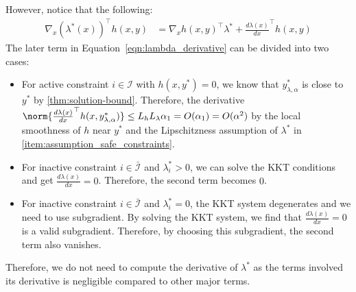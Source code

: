However, notice that the following:
\begin{align}\label{eqn:lambda_derivative}
    \nabla_x (\lambda^*(x))^\top h(x,y) & = \nabla_x h(x,y)^\top \lambda^* + \frac{d \lambda(x)}{dx}^\top h(x,y)
\end{align}
The later term in Equation~\cref{eqn:lambda_derivative} can be divided into two cases:
\begin{itemize}
    \item For active constraint $i \in \mathcal{I}$ with $h(x,y^*) = 0$, we know that $y^*_{\lambda,\alpha}$ is close to $y^*$ by \cref{thm:solution-bound}. Therefore, the derivative $\norm{\frac{d \lambda(x)}{dx}^\top h(x,y^*_{\lambda,\alpha})} \leq L_h L_\lambda \alpha_1 = O(\alpha_1) = O(\alpha^2)$ by the local smoothness of $h$ near $y^*$ and the Lipschitzness assumption of $\lambda^*$ in \cref{item:assumption_safe_constraints}.
    \item For inactive constraint $i \in \bar{\mathcal{I}}$ and $\lambda^*_i > 0$, we can solve the KKT conditions and get $\frac{d \lambda(x)}{dx} = 0$. Therefore, the second term becomes $0$.
    \item For inactive constraint $i \in \bar{\mathcal{I}}$ and $\lambda^*_i = 0$, the KKT system degenerates and we need to use subgradient. By solving the KKT system, we find that $\frac{d \lambda(x)}{dx} = 0$ is a valid subgradient. Therefore, by choosing this subgradient, the second term also vanishes.
\end{itemize}
Therefore, we do not need to compute the derivative of $\lambda^*$ as the terms involved its derivative is negligible compared to other major terms.

